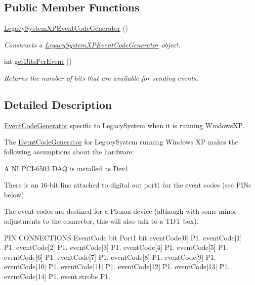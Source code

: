 \subsection*{Public Member Functions}
\begin{DoxyCompactItemize}
\item 
\hyperlink{class_picto_1_1_legacy_system_x_p_event_code_generator_ae12952725855bd6665be95e77b7cb191}{Legacy\-System\-X\-P\-Event\-Code\-Generator} ()
\begin{DoxyCompactList}\small\item\em Constructs a \hyperlink{class_picto_1_1_legacy_system_x_p_event_code_generator}{Legacy\-System\-X\-P\-Event\-Code\-Generator} object. \end{DoxyCompactList}\item 
int \hyperlink{class_picto_1_1_legacy_system_x_p_event_code_generator_a7e06d1f13deed354277dec9851f58afa}{get\-Bits\-Per\-Event} ()
\begin{DoxyCompactList}\small\item\em Returns the number of bits that are available for sending events. \end{DoxyCompactList}\end{DoxyCompactItemize}


\subsection{Detailed Description}
\hyperlink{class_picto_1_1_event_code_generator}{Event\-Code\-Generator} specific to Legacy\-System when it is running Windows\-X\-P. 

The \hyperlink{class_picto_1_1_event_code_generator}{Event\-Code\-Generator} for Legacy\-System running Windows X\-P makes the following assumptions about the hardware\-:
\begin{DoxyItemize}
\item A N\-I P\-C\-I-\/6503 D\-A\-Q is installed as Dev1
\item There is an 16-\/bit line attached to digital out port1 for the event codes (see P\-I\-Ns below)
\item The event codes are destined for a Plexon device (although with some minor adjustments to the connector, this will also talk to a T\-D\-T box).
\end{DoxyItemize}

P\-I\-N C\-O\-N\-N\-E\-C\-T\-I\-O\-N\-S Event\-Code bit Port1 bit event\-Code\mbox{[}0\mbox{]} P1. event\-Code\mbox{[}1\mbox{]} P1. event\-Code\mbox{[}2\mbox{]} P1. event\-Code\mbox{[}3\mbox{]} P1. event\-Code\mbox{[}4\mbox{]} P1. event\-Code\mbox{[}5\mbox{]} P1. event\-Code\mbox{[}6\mbox{]} P1. event\-Code\mbox{[}7\mbox{]} P1. event\-Code\mbox{[}8\mbox{]} P1. event\-Code\mbox{[}9\mbox{]} P1. event\-Code\mbox{[}10\mbox{]} P1. event\-Code\mbox{[}11\mbox{]} P1. event\-Code\mbox{[}12\mbox{]} P1. event\-Code\mbox{[}13\mbox{]} P1. event\-Code\mbox{[}14\mbox{]} P1. event strobe P1.

